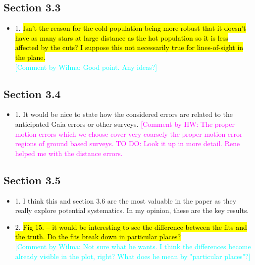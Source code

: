\documentclass[10pt,a4paper]{article}
\newcommand{\Wilma}[1]{\textcolor{Magenta}{#1}}
\newcommand{\HW}[1]{\textcolor{Cyan}{#1}}
\begin{document}
\subsection{Section 3.3}
\begin{itemize}
\item 1. \hl{Isn't the reason for the cold population being more robust that it doesn't have as many stars at large distance as the hot population so it is less affected by the cuts? I suppose this not necessarily true for lines-of-sight in the plane.}\\
\HW{[Comment by Wilma: Good point. Any ideas?]}
\end{itemize}

\subsection{Section 3.4}
\begin{itemize}
\item 1. It would be nice to state how the considered errors are related to the anticipated Gaia errors or other surveys. \Wilma{[Comment by HW: The proper motion errors which we choose cover very coarsely the proper motion error regions of ground based surveys. TO DO: Look it up in more detail. Rene helped me with the distance errors.}
\end{itemize}

\subsection{Section 3.5}
\begin{itemize}
\item 1. I think this and section 3.6 are the most valuable in the paper as they really explore potential systematics. In my opinion, these are the key results.
\item 2. \hl{Fig 15. -- it would be interesting to see the difference between the fits and the truth. Do the fits break down in particular places?}\\\HW{[Comment by Wilma: Not sure what he wants. I think the differences become already visible in the plot, right? What does he mean by "particular places"?]}
\end{itemize}
\end{document}
